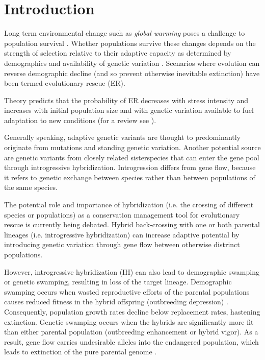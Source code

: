 \documentclass[a4paper,10pt]{article}
\begin{document}
 
\section*{Introduction}

Long term environmental change such as \textit{global warming} poses a challenge to population survival \cite{parmesan2006ecological} \cite{hughes2000biological}. Whether populations survive these changes depends on the strength of selection relative to their adaptive capacity as determined by demographics and availability of genetic variation \cite{lynch1993evolution} \cite{gomulkiewicz1995does} \cite{orr2008population}. Scenarios where evolution can reverse demographic decline (and so prevent otherwise inevitable extinction) have been termed evolutionary rescue (ER). 

Theory predicts that the probability of ER decreases with stress intensity and increases with initial population size and with genetic variation available to fuel adaptation to new conditions (for a review see \cite{bell2008adaptation}). 

Generally speaking, adaptive genetic variants are thought to predominantly originate from mutations and standing genetic variation. Another potential source are genetic variants from closely related sisterspecies that can enter the gene pool through introgressive hybridization. Introgression differs from gene flow, because it refers to genetic exchange between species rather than between populations of the same species. 

The potential role and importance of hybridization (i.e. the crossing of different species or populations) as a conservation management tool for evolutionary rescue is currently being debated. Hybrid back-crossing with one or both parental lineages (i.e. introgressive hybridization) can increase adaptive potential by introducing genetic variation through gene flow between otherwise distrinct populations.
	
However, introgressive hybridization (IH) can also lead to demographic swamping or genetic swamping, resulting in loss of the target lineage. Demographic swamping occurs when wasted reproductive efforts of the parental populations causes reduced fitness in the hybrid offspring (outbreeding depression) \cite{wolf2001predicting}. Consequently, population growth rates decline below replacement rates, hastening extinction. Genetic swamping occurs when the hybrids are significantly more fit than either parental population (outbreeding enhancement or hybrid vigor). As a result, gene flow carries undesirable alleles into the endangered population, which leads to extinction of the pure parental genome \cite{woodruff1987fifty} \cite{allendorf2001problems}. 
\end{document}
